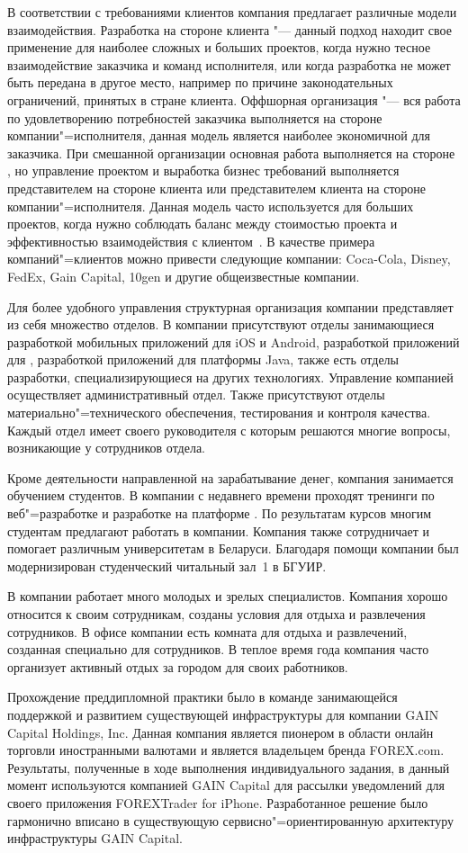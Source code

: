 В соответствии с требованиями клиентов компания предлагает различные модели взаимодействия.
Разработка на стороне клиента "--- данный подход находит свое применение для наиболее сложных и больших проектов, когда нужно тесное взаимодействие заказчика и команд исполнителя, или когда разработка не может быть передана в другое место, например по причине законодательных ограничений, принятых в стране клиента. 
Оффшорная организация "--- вся работа по удовлетворению потребностей заказчика выполняется на стороне компании"=исполнителя, данная модель является наиболее экономичной для заказчика.
При смешанной организации основная работа выполняется на стороне \company{}, но управление проектом и выработка бизнес требований выполняется представителем \company{} на стороне клиента или представителем клиента на стороне компании"=исполнителя.
Данная модель часто используется для больших проектов, когда нужно соблюдать баланс между стоимостью проекта и эффективностью взаимодействия с клиентом~\cite{itechart_2013}.   
В качестве примера компаний"=клиентов \company{} можно привести следующие компании: Coca-Cola, Disney, FedEx, Gain Capital, 10gen и другие общеизвестные компании.

Для более удобного управления структурная организация компании представляет из себя множество отделов.
В компании присутствуют отделы занимающиеся разработкой мобильных приложений для iOS и Android, разработкой приложений для \dotnet{}, разработкой приложений для платформы Java, также есть отделы разработки, специализирующиеся на других технологиях. 
Управление компанией осуществляет административный отдел. 
Также присутствуют отделы материально"=технического обеспечения, тестирования и контроля качества.
Каждый отдел имеет своего руководителя с которым решаются многие вопросы, возникающие у сотрудников отдела.

Кроме деятельности направленной на зарабатывание денег, компания занимается обучением студентов.
В компании с недавнего времени проходят тренинги по веб"=разработке и разработке на платформе \dotnet{}.
По результатам курсов многим студентам предлагают работать в компании.
Компания также сотрудничает и помогает различным университетам в Беларуси.
Благодаря помощи компании был модернизирован студенческий читальный зал~\No{}1 в БГУИР.

В компании работает много молодых и зрелых специалистов.
Компания хорошо относится к своим сотрудникам, созданы условия для отдыха и развлечения сотрудников.
В офисе компании есть комната для отдыха и развлечений, созданная специально для сотрудников.
В теплое время года компания часто организует активный отдых за городом для своих работников.

Прохождение преддипломной практики было в команде занимающейся поддержкой и развитием существующей инфраструктуры для компании GAIN Capital Holdings, Inc.
Данная компания является пионером в области онлайн торговли иностранными валютами и является владельцем бренда FOREX.com.
Результаты, полученные в ходе выполнения индивидуального задания, в данный момент используются компанией GAIN Capital для рассылки уведомлений для своего приложения FOREXTrader for iPhone\texttrademark.
Разработанное решение было гармонично вписано в существующую сервисно"=ориентированную архитектуру инфраструктуры GAIN Capital.